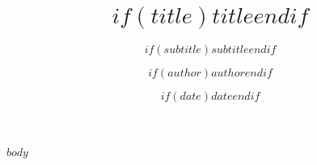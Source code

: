 \documentclass[..]{_config/fineprintbrief}
\title{$if(title)$$title$$endif$}
\subtitle{$if(subtitle)$$subtitle$$endif$}
\author{$if(author)$$author$$endif$}
\date{$if(date)$$date$$endif$}
\begin{document}
\maketitle

$body$

\end{document}
